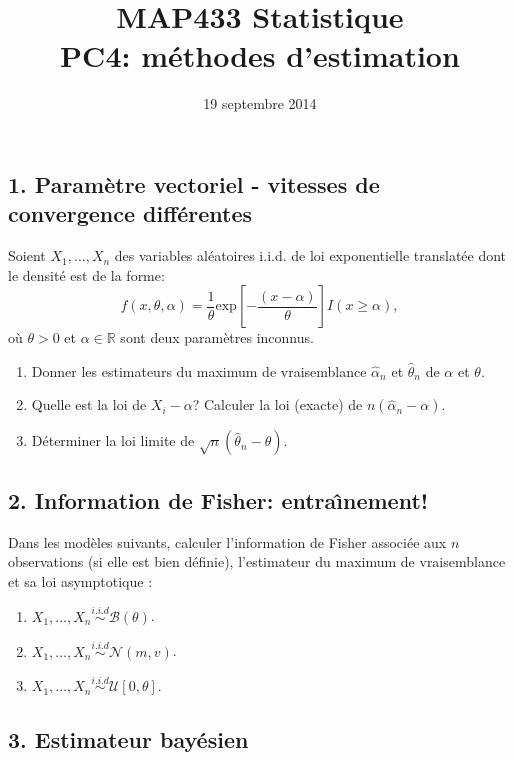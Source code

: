 \documentclass[a4paper,11pt,fleqn]{article}
\title{{\bf MAP433 Statistique}\\
{\bf PC4: m\'ethodes d'estimation}}
\date{19 septembre 2014}
\newcommand{\R}{\ensuremath{\mathbb{R}}}
\newcommand{\1}{\ensuremath{\mathbbm{1}}}
\begin{document}
\maketitle

\subsection*{1. Param\`etre vectoriel - vitesses de convergence diff\'erentes}
Soient $X_1, \ldots,X_n$ des variables al\'eatoires i.i.d. de loi
exponentielle translat\'ee dont le densit\'e est de la forme:
$$f(x,\theta,\alpha)=\frac{1}{\theta}\text{exp}\left[-
\frac{(x-\alpha)}{\theta}\right]I(x\geq\alpha),$$ o\`u
$\theta>0$ et $\alpha\in \R$ sont deux param\`etres inconnus.
\begin{enumerate}
\item Donner les estimateurs du maximum de vraisemblance $\hat{\alpha}_n$ et
$\hat{\theta}_n$ de $\alpha$ et $\theta$.
\item Quelle est la loi de $X_{i}-\alpha$? Calculer la loi (exacte) de $n(\hat{\alpha}_n-\alpha)$.
\item D\'eterminer la loi limite de $\sqrt{n}(\hat{\theta}_n-\theta)$.
\end{enumerate}
%

\subsection*{2. Information de Fisher: entra\^{\i}nement!}

Dans les mod\`eles suivants, calculer  l'information de Fisher associ\'ee aux $n$ observations (si elle est bien d\'efinie), l'estimateur du maximum de vraisemblance et sa loi asymptotique :

\begin{enumerate}
\item $X_1,\ldots,X_{n}\stackrel{i.i.d}{\sim} \mathcal{B}(\theta)$.
\item $X_1,\ldots,X_{n}\stackrel{i.i.d}{\sim} \mathcal{N}(m,v)$.
\item $X_1,\ldots,X_{n}\stackrel{i.i.d}{\sim}\mathcal{U}[0,\theta]$.
\end{enumerate}


\subsection*{3. Estimateur bay\'esien}
\end{document}
